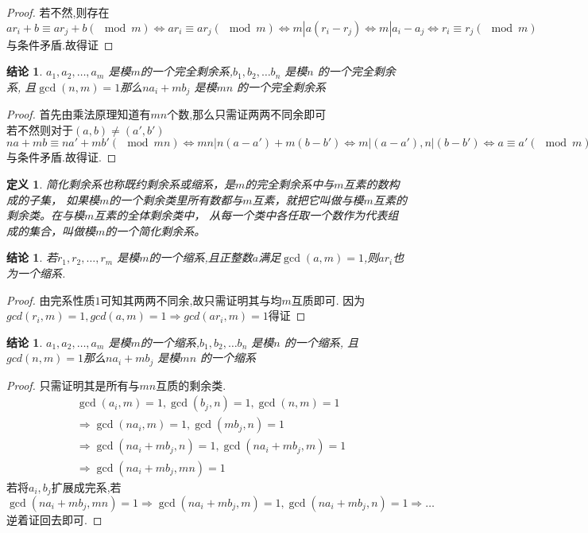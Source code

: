 \documentclass[12pt, a4paper, oneside]{ctexbook}
\newtheorem{definition}[theorem]{定义}
\newtheorem{proposition}[theorem]{结论}
\begin{document}
\begin{proof}
  若不然,则存在$ar_i+b \equiv ar_j+b (\mod m) \iff ar_i \equiv ar_j (\mod m) \iff m|a(r_i-r_j) \iff m|a_i-a_j \iff r_i \equiv r_j (\mod m)$与条件矛盾.故得证
\end{proof}


\begin{proposition}
  $a_1,a_2,\dots,a_m$ 是模$m$的一个完全剩余系,$b_1,b_2,\dots b_n$ 是模$n$ 的一个完全剩余系, 
  且$\gcd(n,m)=1$那么$na_i+mb_j$ 是模$mn$ 的一个完全剩余系
\end{proposition}

\begin{proof}
  首先由乘法原理知道有$mn$个数,那么只需证两两不同余即可\\
若不然则对于$(a,b)\neq(a',b')$
$na+mb \equiv na'+mb' (\mod mn) \iff mn|n(a-a')+m(b-b') \iff
m|(a-a'),n|(b-b') \iff a \equiv a' (\mod m),b \equiv b' (\mod n)$ 与条件矛盾.故得证.
\end{proof}

\begin{definition}
  简化剩余系也称既约剩余系或缩系，是$m$的完全剩余系中与$m$互素的数构成的子集，
  如果模$m$的一个剩余类里所有数都与$m$互素，就把它叫做与模$m$互素的剩余类。在与模$m$互素的全体剩余类中，
  从每一个类中各任取一个数作为代表组成的集合，叫做模$m$的一个简化剩余系。
\end{definition}

\begin{proposition}
  若$r_1,r_2,\dots ,r_m$ 是模$m$的一个缩系,且正整数$a$满足$\gcd(a,m)=1$,则$ar_i$也为一个缩系.
\end{proposition}


\begin{proof}
  由完系性质$1$可知其两两不同余,故只需证明其与均$m$互质即可.
因为$gcd(r_i,m)=1,gcd(a,m)=1\Rightarrow gcd(ar_i,m)=1$得证
\end{proof}

\begin{proposition}
  $a_1,a_2,\dots,a_m$ 是模$m$的一个缩系,$b_1,b_2,\dots b_n$ 是模$n$ 的一个缩系, 且$gcd(n,m)=1$那么$na_i+mb_j$ 是模$mn$ 的一个缩系
\end{proposition}

\begin{proof}
  只需证明其是所有与$mn$互质的剩余类.
$$
\begin{aligned}
  &\gcd(a_i,m)=1,\gcd(b_j,n)=1,\gcd(n,m)=1 \\&\Rightarrow \gcd(na_i,m)=1,\gcd(mb_j,n)=1\\  &\Rightarrow \gcd(na_i+mb_j,n)=1,\gcd(na_i+mb_j,m)=1\\& \Rightarrow \gcd(na_i+mb_j,mn)=1
\end{aligned}
$$
若将$a_i,b_j$扩展成完系,若$\gcd(na_i+mb_j,mn)=1 \Rightarrow \gcd(na_i+mb_j,m)=1,\gcd(na_i+mb_j,n)=1\Rightarrow \dots$ 逆着证回去即可.
\end{proof}
\end{document}
